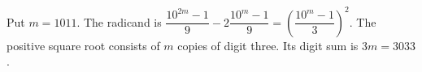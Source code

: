 Put $m=1011$. The radicand is $\dfrac{10^{2m}-1}{9}-2\dfrac{10^m-1}{9}=\left(\dfrac{10^m-1}{3}\right)^2$. The positive square root consists of $m$ copies of digit three. Its digit sum is $3m=\boxed{3033}$.

